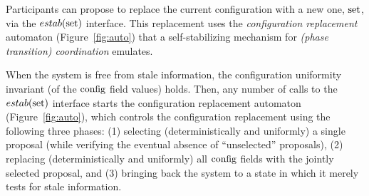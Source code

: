 \documentclass[11pt]{article}
\begin{document}
{
Participants can propose to replace the current configuration with a new one, $\textnormal{set}$, via the $estab(\textnormal{set})$ interface. This replacement uses the {\em configuration replacement} automaton (Figure~\ref{fig:auto}) that a self-stabilizing mechanism for {\em (phase transition) coordination} emulates.  


When the system is free from stale information, the configuration uniformity invariant (of the $\textnormal{config}$ field values) holds. Then, any number of calls to the $estab(\textnormal{set})$ interface starts the configuration replacement automaton (Figure~\ref{fig:auto}), which controls the configuration replacement using the following three phases: (1) selecting (deterministically and uniformly) a single proposal (while verifying the eventual absence of ``unselected'' proposals), (2) replacing (deterministically and uniformly) all $\textnormal{config}$ fields with the jointly selected proposal, and (3) bringing back the system to a state in which it merely tests for stale information. 

}
\end{document}
